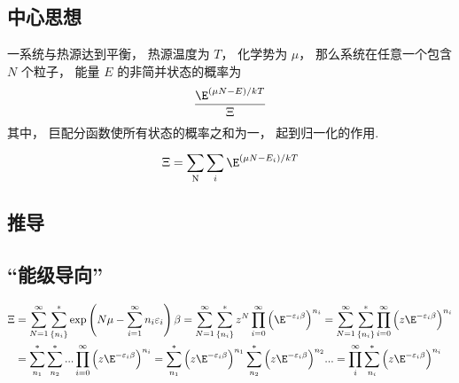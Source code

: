 
\subsection{中心思想}
一系统与热源达到平衡， 热源温度为 $T$，  化学势为 $\mu $，  那么系统在任意一个包含 $N$ 个粒子， 能量 $E$ 的非简并状态的概率为
\begin{equation}
\frac{{{\E^{(\mu N - E)/kT}}}}{\Xi }
\end{equation}
其中， 巨配分函数使所有状态的概率之和为一， 起到归一化的作用.
\begin{equation}
\Xi  = \sum\limits_{\rm{N}}^{} {\sum\limits_i^{} {{\E^{(\mu N - {E_i})/kT}}} } \end{equation}
\subsection{推导} %

\subsection{“能级导向”}

\begin{equation}
\begin{aligned}
\Xi & = \sum\limits_{N = 1}^\infty  {\sum\limits_{\{ {n_i}\} }^ *  {\exp \left( {N\mu  - \sum\limits_{i = 1}^\infty  {{n_i}{\varepsilon_i}} } \right)\beta } }  = \sum\limits_{N = 1}^\infty  {\sum\limits_{\{ {n_i}\} }^ *  {{z^N}\prod\limits_{i = 0}^\infty  {{{\left( {{\E^{ - {\varepsilon_i}\beta }}} \right)}^{{n_i}}}} } }  = \sum\limits_{N = 1}^\infty  {\sum\limits_{\{ {n_i}\} }^ *  {\prod\limits_{i = 0}^\infty  {{{\left( {z{\E^{ - {\varepsilon_i}\beta }}} \right)}^{{n_i}}}} } } \\
 &= \sum\limits_{{n_1}}^ *  {\sum\limits_{{n_2}}^ *  {...\prod\limits_{i = 0}^\infty  {{{\left( {z{\E^{ - {\varepsilon_i}\beta }}} \right)}^{{n_i}}}} } }  = \sum\limits_{{n_1}}^ *  {{{\left( {z{\E^{ - {\varepsilon_i}\beta }}} \right)}^{{n_1}}}} \sum\limits_{{n_2}}^ *  {{{\left( {z{\E^{ - {\varepsilon_i}\beta }}} \right)}^{{n_2}}}} ... = \prod\limits_i^\infty  {\sum\limits_{{n_i}}^ *  {{{\left( {z{\E^{ - {\varepsilon_i}\beta }}} \right)}^{{n_i}}}} }
\end{aligned}
\end{equation}
